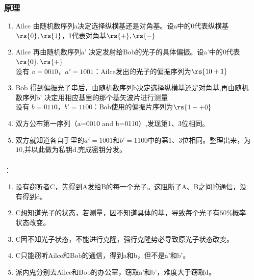 \begin{frame}
    \frametitle{原理}
    \begin{enumerate}
        \item Ailce 由随机数序列a决定选择纵横基还是对角基。设a中的0代表纵横基{$\rs{0},\rs{1}$}，1代表对角基{$\rs{+},\rs{-}$} 
        \item Ailce 再由随机数序列a' 决定发射给Bob的光子的具体偏振。设a'中的0代表$\rs{0},\rs{+}$\\
        \hspace{2em} 设有 $a=0010$，$a'=1001$：Ailce发出的光子的偏振序列为$\rs{10+1}$
        \item Bob 得到偏振光子串后，由随机数序列b决定选择纵横基还是对角基,再由随机数序列b' 决定用相应基里的那个基矢波片进行测量\\
        \hspace{2em} 设有 $b=0110$，$b'=1100$：Bob使用的偏振片序列为$\rs{1-+0}$ 
        \item 双方公布第一序列（a=0010 and b=0110）,发现第1、3位相同。
        \item 双方就知道各自手里的$a'=1001$和$b'=1100$中的第1、3位相同。整理出来，为$10$,并以此做为私钥d,完成密钥分发。
    \end{enumerate}
\end{frame}

\begin{frame}
    \frametitle{}
    {\color{red}{保密性分析}}：
    \begin{enumerate}
        \item 设有窃听者C，先得到A发给B的每一个光子。这阻断了A、B之间的通信，没有得到d。
        \item C想知道光子的状态，若测量，因不知道具体的基，导致每个光子有$50\%$概率状态改变。
        \item C因不知光子状态，不能进行克隆，强行克隆势必导致原光子状态改变。
        \item C只能窃听Ailce和Bob的通信，得到a和b，但不是a'和b'。
        \item 派内鬼分别去Ailce和Bob的办公室，窃取a'和b'，难度大于窃取d。
    \end{enumerate}
\end{frame}

